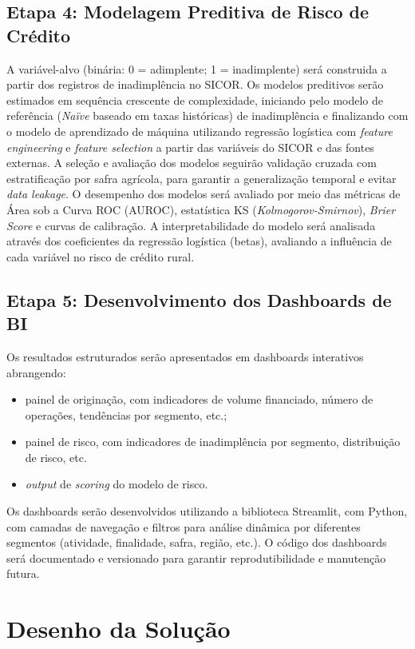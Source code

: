 \subsection{Etapa 4: Modelagem Preditiva de Risco de Crédito}

A variável-alvo (binária: 0 = adimplente; 1 = inadimplente) será construida a partir dos registros de inadimplência no SICOR. Os modelos preditivos serão estimados em sequência crescente de complexidade, iniciando pelo modelo de referência (\textit{Naïve} baseado em taxas históricas) de inadimplência e finalizando com o modelo de aprendizado de máquina utilizando regressão logística com \textit{feature engineering} e \textit{feature selection} a partir das variáveis do SICOR e das fontes externas. A seleção e avaliação dos modelos seguirão validação cruzada com estratificação por safra agrícola, para garantir a generalização temporal e evitar \textit{data leakage}. O desempenho dos modelos será avaliado por meio das métricas de Área sob a Curva ROC (AUROC), estatística KS (\textit{Kolmogorov-Smirnov}), \textit{Brier Score} e curvas de calibração. A interpretabilidade do modelo será analisada através dos coeficientes da regressão logística (betas), avaliando a influência de cada variável no risco de crédito rural.

\subsection{Etapa 5: Desenvolvimento dos Dashboards de BI}

Os resultados estruturados serão apresentados em dashboards interativos abrangendo:
\begin{itemize}
    \item[(i)] painel de originação, com indicadores de volume financiado, número de operações, tendências por segmento, etc.;
    \item[(ii)] painel de risco, com indicadores de inadimplência por segmento, distribuição de risco, etc.
    \item[(iii)] \textit{output} de \textit{scoring} do modelo de risco.
\end{itemize}
Os dashboards serão desenvolvidos utilizando a biblioteca Streamlit, com Python, com camadas de navegação e filtros para análise dinâmica por diferentes segmentos (atividade, finalidade, safra, região, etc.). O código dos dashboards será documentado e versionado para garantir reprodutibilidade e manutenção futura.

\section{Desenho da Solução}


